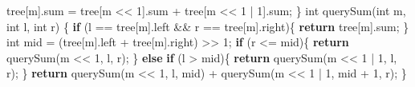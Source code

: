 \documentclass[
]{article}
\newenvironment{Shaded}{}{}
\newcommand{\ControlFlowTok}[1]{\textcolor[rgb]{0.00,0.44,0.13}{\textbf{#1}}}
\newcommand{\DataTypeTok}[1]{\textcolor[rgb]{0.56,0.13,0.00}{#1}}
\newcommand{\DecValTok}[1]{\textcolor[rgb]{0.25,0.63,0.44}{#1}}
\newcommand{\NormalTok}[1]{#1}
\newcommand{\OperatorTok}[1]{\textcolor[rgb]{0.40,0.40,0.40}{#1}}
\begin{document}
\begin{Shaded}
\begin{Highlighting}[]
\NormalTok{    tree}\OperatorTok{[}\NormalTok{m}\OperatorTok{].}\NormalTok{sum }\OperatorTok{=}\NormalTok{ tree}\OperatorTok{[}\NormalTok{m }\OperatorTok{\textless{}\textless{}} \DecValTok{1}\OperatorTok{].}\NormalTok{sum }\OperatorTok{+}\NormalTok{ tree}\OperatorTok{[}\NormalTok{m }\OperatorTok{\textless{}\textless{}} \DecValTok{1} \OperatorTok{|} \DecValTok{1}\OperatorTok{].}\NormalTok{sum}\OperatorTok{;}
\OperatorTok{\}}
\DataTypeTok{int}\NormalTok{ querySum}\OperatorTok{(}\DataTypeTok{int}\NormalTok{ m}\OperatorTok{,} \DataTypeTok{int}\NormalTok{ l}\OperatorTok{,} \DataTypeTok{int}\NormalTok{ r}\OperatorTok{)}
\OperatorTok{\{}
    \ControlFlowTok{if} \OperatorTok{(}\NormalTok{l }\OperatorTok{==}\NormalTok{ tree}\OperatorTok{[}\NormalTok{m}\OperatorTok{].}\NormalTok{left }\OperatorTok{\&\&}\NormalTok{ r }\OperatorTok{==}\NormalTok{ tree}\OperatorTok{[}\NormalTok{m}\OperatorTok{].}\NormalTok{right}\OperatorTok{)\{}
        \ControlFlowTok{return}\NormalTok{ tree}\OperatorTok{[}\NormalTok{m}\OperatorTok{].}\NormalTok{sum}\OperatorTok{;}
    \OperatorTok{\}}
    \DataTypeTok{int}\NormalTok{ mid }\OperatorTok{=} \OperatorTok{(}\NormalTok{tree}\OperatorTok{[}\NormalTok{m}\OperatorTok{].}\NormalTok{left }\OperatorTok{+}\NormalTok{ tree}\OperatorTok{[}\NormalTok{m}\OperatorTok{].}\NormalTok{right}\OperatorTok{)} \OperatorTok{\textgreater{}\textgreater{}} \DecValTok{1}\OperatorTok{;}
    \ControlFlowTok{if} \OperatorTok{(}\NormalTok{r }\OperatorTok{\textless{}=}\NormalTok{ mid}\OperatorTok{)\{}
        \ControlFlowTok{return}\NormalTok{ querySum}\OperatorTok{(}\NormalTok{m }\OperatorTok{\textless{}\textless{}} \DecValTok{1}\OperatorTok{,}\NormalTok{ l}\OperatorTok{,}\NormalTok{ r}\OperatorTok{);}
    \OperatorTok{\}}
    \ControlFlowTok{else} \ControlFlowTok{if} \OperatorTok{(}\NormalTok{l }\OperatorTok{\textgreater{}}\NormalTok{ mid}\OperatorTok{)\{}
        \ControlFlowTok{return}\NormalTok{ querySum}\OperatorTok{(}\NormalTok{m }\OperatorTok{\textless{}\textless{}} \DecValTok{1} \OperatorTok{|} \DecValTok{1}\OperatorTok{,}\NormalTok{ l}\OperatorTok{,}\NormalTok{ r}\OperatorTok{);}
    \OperatorTok{\}}
    \ControlFlowTok{return}\NormalTok{ querySum}\OperatorTok{(}\NormalTok{m }\OperatorTok{\textless{}\textless{}} \DecValTok{1}\OperatorTok{,}\NormalTok{ l}\OperatorTok{,}\NormalTok{ mid}\OperatorTok{)} \OperatorTok{+}\NormalTok{ querySum}\OperatorTok{(}\NormalTok{m }\OperatorTok{\textless{}\textless{}} \DecValTok{1} \OperatorTok{|} \DecValTok{1}\OperatorTok{,}\NormalTok{ mid }\OperatorTok{+} \DecValTok{1}\OperatorTok{,}\NormalTok{ r}\OperatorTok{);}
\OperatorTok{\}}

\end{Highlighting}
\end{Shaded}
\end{document}
